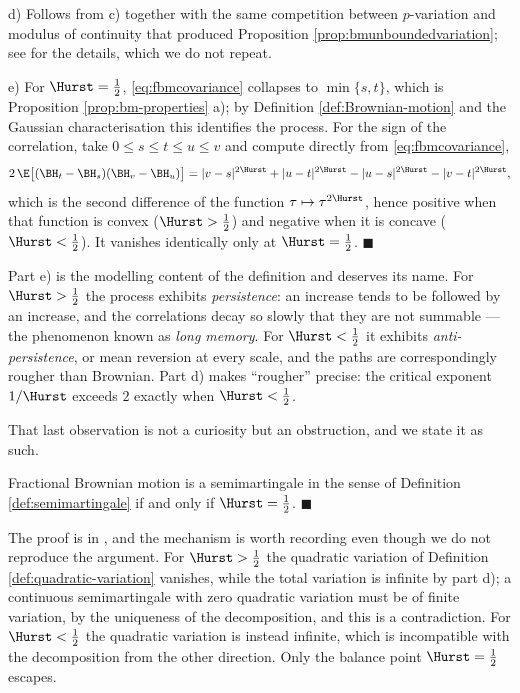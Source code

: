 d) Follows from c) together with the same competition between $p$-variation and modulus of
continuity that produced Proposition \ref{prop:bmunboundedvariation}; see \cite[Ch.\ 15]{frizvictoir2010}
for the details, which we do not repeat.

e) For $\Hurst=\tfrac12$, \eqref{eq:fbmcovariance} collapses to $\min\{s,t\}$, which is Proposition
\ref{prop:bm-properties} a); by Definition \ref{def:Brownian-motion} and the Gaussian
characterisation this identifies the process. For the sign of the correlation, take
$0\leq s\leq t\leq u\leq v$ and compute directly from \eqref{eq:fbmcovariance},
\[
2\,\E\bigl[(\BH_t-\BH_s)(\BH_v-\BH_u)\bigr] = |v-s|^{2\Hurst} + |u-t|^{2\Hurst} - |u-s|^{2\Hurst} - |v-t|^{2\Hurst},
\]
which is the second difference of the function $\tau \mapsto \tau^{2\Hurst}$, hence positive when
that function is convex ($\Hurst>\tfrac12$) and negative when it is concave ($\Hurst<\tfrac12$).
It vanishes identically only at $\Hurst = \tfrac12$. \hfill $\blacksquare$

\medskip

Part e) is the modelling content of the definition and deserves its name. For $\Hurst > \tfrac12$
the process exhibits \emph{persistence}: an increase tends to be followed by an increase, and the
correlations decay so slowly that they are not summable --- the phenomenon known as \emph{long
memory}. For $\Hurst < \tfrac12$ it exhibits \emph{anti-persistence}, or mean reversion at every
scale, and the paths are correspondingly rougher than Brownian. Part d) makes ``rougher'' precise:
the critical exponent $1/\Hurst$ exceeds $2$ exactly when $\Hurst < \tfrac12$.

That last observation is not a curiosity but an obstruction, and we state it as such.

\begin{theorem}[Rogers]\label{thm:fbmnotsemimartingale}
Fractional Brownian motion is a semimartingale in the sense of Definition \ref{def:semimartingale}
if and only if $\Hurst = \tfrac12$. \hfill $\blacksquare$
\end{theorem}

The proof is in \cite{rogers1997}, and the mechanism is worth recording even though we do not
reproduce the argument. For $\Hurst > \tfrac12$ the quadratic variation of Definition
\ref{def:quadratic-variation} vanishes, while the total variation is infinite by part d); a
continuous semimartingale with zero quadratic variation must be of finite variation, by the
uniqueness of the decomposition, and this is a contradiction. For $\Hurst < \tfrac12$ the quadratic
variation is instead infinite, which is incompatible with the decomposition from the other
direction. Only the balance point $\Hurst = \tfrac12$ escapes.

